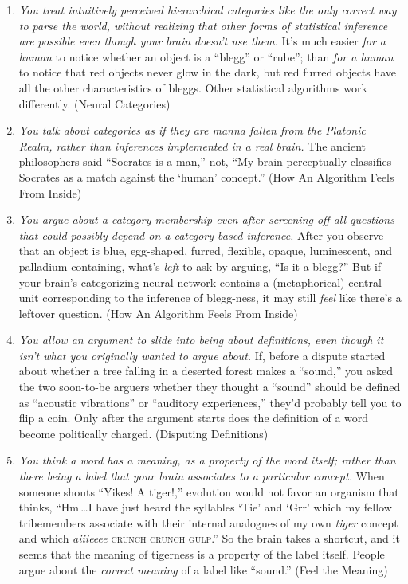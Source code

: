 {{\begin{enumerate}
\item {
 \textit{You treat intuitively perceived hierarchical categories
like the only correct way to parse the world, without realizing that
other forms of statistical inference are possible even though your
brain doesn't use them.} It's much
easier \textit{for a human} to notice whether an object is a
``blegg'' or
``rube''; than \textit{for a human}
to notice that red objects never glow in the dark, but red furred
objects have all the other characteristics of bleggs. Other statistical
algorithms work differently. (Neural Categories)}

\item {
 \textit{You talk about categories as if they are manna fallen from
the Platonic Realm, rather than inferences implemented in a real
brain.} The ancient philosophers said ``Socrates is a
man,'' not, ``My brain perceptually
classifies Socrates as a match against the
`human' concept.''
(How An Algorithm Feels From Inside)}

\item {
 \textit{You argue about a category membership even after screening
off all questions that could possibly depend on a category-based
inference.} After you observe that an object is blue, egg-shaped,
furred, flexible, opaque, luminescent, and palladium-containing,
what's \textit{left} to ask by arguing,
``Is it a blegg?'' But if your
brain's categorizing neural network contains a
(metaphorical) central unit corresponding to the inference of
blegg-ness, it may still \textit{feel} like there's a
leftover question. (How An Algorithm Feels From Inside)}

\item {
 \textit{You allow an argument to slide into being about
definitions, even though it isn't what you originally
wanted to argue about.} If, before a dispute started about whether a
tree falling in a deserted forest makes a
``sound,'' you asked the two
soon-to-be arguers whether they thought a
``sound'' should be defined as
``acoustic vibrations'' or
``auditory experiences,''
they'd probably tell you to flip a coin. Only after the
argument starts does the definition of a word become politically
charged. (Disputing Definitions)}

\item {
 \textit{You think a word has a meaning, as a property of the word
itself; rather than there being a label that your brain associates to a
particular concept.} When someone shouts ``Yikes! A
tiger!,'' evolution would not favor an organism that
thinks, ``Hm\,\ldots I have just heard the syllables
`Tie' and
`Grr' which my fellow tribemembers
associate with their internal analogues of my own \textit{tiger}
concept and which \textit{aiiieeee} \textsc{crunch crunch
gulp}.'' So the brain takes a shortcut, and it seems
that the meaning of tigerness is a property of the label itself. People
argue about the \textit{correct meaning} of a label like
``sound.'' (Feel the Meaning)}


\end{enumerate}}}
